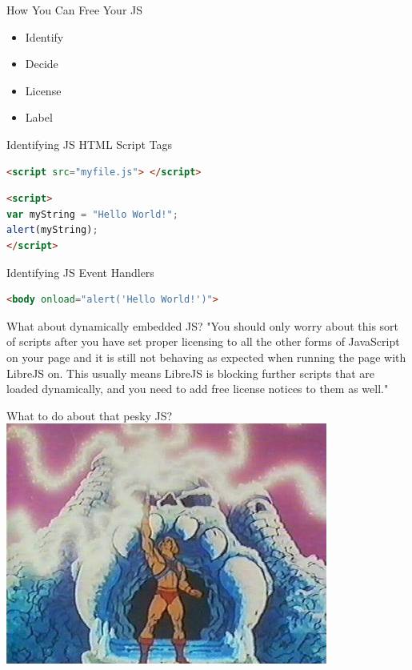 \documentclass[11pt]{beamer}
\begin{document}
\begin{frame}{How You Can Free Your JS}
\begin{itemize}
\item Identify\pause
\item Decide\pause
\item License\pause
\item Label\pause
\end{itemize}
\end{frame}

\begin{frame}[fragile]{Identifying JS}
HTML Script Tags
\begin{lstlisting}[language=HTML]
<script src="myfile.js"> </script>
\end{lstlisting}
\begin{lstlisting}[language=HTML]
<script>
var myString = "Hello World!";
alert(myString);
</script>
\end{lstlisting}
\end{frame}

\begin{frame}[fragile]{Identifying JS}
Event Handlers
\begin{lstlisting}[language=HTML]
<body onload="alert('Hello World!')">
\end{lstlisting}
\end{frame}

\begin{frame}{What about dynamically embedded JS?}
"You should only worry about this sort of scripts after you have set proper licensing to all the other forms of JavaScript on your page and it is still not behaving as expected when running the page with LibreJS on. This usually means LibreJS is blocking further scripts that are loaded dynamically, and you need to add free license notices to them as well."
\end{frame}

\begin{frame}{What to do about that pesky JS?}
\includegraphics[keepaspectratio=true,width=\framewidth]{heman.jpg}
\end{frame}
\end{document}
